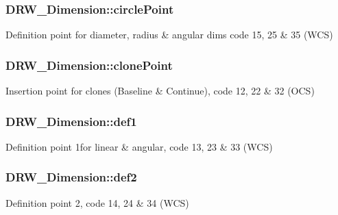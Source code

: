 \subsubsection[{circle\+Point}]{ D\+R\+W\+\_\+\+Dimension\+::circle\+Point\hspace{0.3cm}{\ttfamily [private]}}\label{class_d_r_w___dimension_af4a22d548b9618d76cd57583d90eeb12}
Definition point for diameter, radius \& angular dims code 15, 25 \& 35 (W\+C\+S) \hypertarget{class_d_r_w___dimension_a62895c83fdbe0acf0d94db2bf3716711}{}
\subsubsection[{clone\+Point}]{ D\+R\+W\+\_\+\+Dimension\+::clone\+Point\hspace{0.3cm}{\ttfamily [private]}}\label{class_d_r_w___dimension_a62895c83fdbe0acf0d94db2bf3716711}
Insertion point for clones (Baseline \& Continue), code 12, 22 \& 32 (O\+C\+S) \hypertarget{class_d_r_w___dimension_acce64719064a0d64a19a715c6f42a6a5}{}
\subsubsection[{def1}]{ D\+R\+W\+\_\+\+Dimension\+::def1\hspace{0.3cm}{\ttfamily [private]}}\label{class_d_r_w___dimension_acce64719064a0d64a19a715c6f42a6a5}
Definition point 1for linear \& angular, code 13, 23 \& 33 (W\+C\+S) \hypertarget{class_d_r_w___dimension_a8372d63a865ea08dc547e3ee774abb0c}{}
\subsubsection[{def2}]{ D\+R\+W\+\_\+\+Dimension\+::def2\hspace{0.3cm}{\ttfamily [private]}}\label{class_d_r_w___dimension_a8372d63a865ea08dc547e3ee774abb0c}
Definition point 2, code 14, 24 \& 34 (W\+C\+S) \hypertarget{class_d_r_w___dimension_a1f00cdbce7d5d7139578ded6fe44f336}{}
